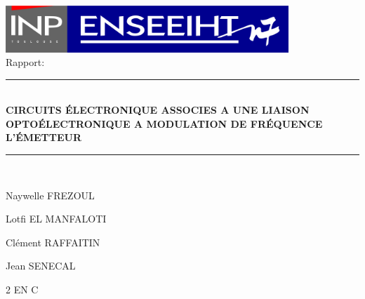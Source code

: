 \documentclass[a4paper]{report}
\begin{document}
\\[0.5cm]\center \includegraphics[width=0.8\textwidth]{inpn7logo.pdf}\\[5cm]



{\Large Rapport:}\\[0.5cm]

\rule{\linewidth}{0.5mm} \\[0.4cm]
{ \huge \bfseries CIRCUITS ÉLECTRONIQUE ASSOCIES A UNE LIAISON OPTOÉLECTRONIQUE A MODULATION DE FRÉQUENCE\\[0.4cm] }
{ \large \bfseries L'ÉMETTEUR\\[0.4cm] }
\rule{\linewidth}{0.5mm} \\[1.5cm]

\begin{center}
\end{center}


\noindent
\center
\begin{minipage}{0.4\textwidth}
  \begin{flushleft} \large   
    Naywelle \textsc{FREZOUL} 
  \end{flushleft}
\end{minipage}
\begin{minipage}{0.4\textwidth}
  \begin{flushright} \large
    Lotfi \textsc{EL MANFALOTI} 
  \end{flushright}
\end{minipage}

\vspace{0.5cm}

\begin{minipage}{0.4\textwidth}
  \begin{flushleft} \large   
    Clément \textsc{RAFFAITIN} 
  \end{flushleft}
\end{minipage}
\begin{minipage}{0.4\textwidth}
  \begin{flushright} \large
    Jean \textsc{SENECAL} 
  \end{flushright}
\end{minipage}
\vfill

{\large 2 EN C}
\end{document}
